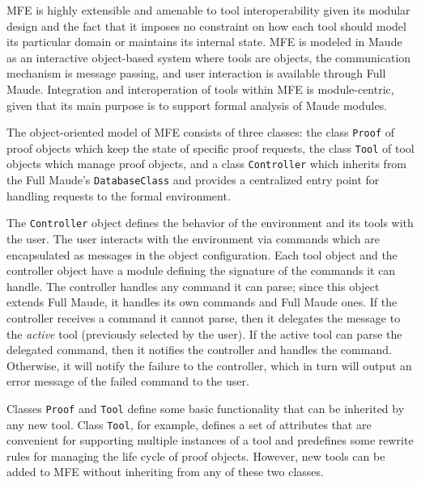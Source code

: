 \documentclass{llncs}
\begin{document}
MFE is highly extensible and amenable to tool interoperability
given its modular design and the fact that it imposes no constraint
on how each tool should model its particular domain or 
 maintains its internal state.
MFE is modeled in Maude as an interactive object-based system where 
tools are objects, the communication mechanism
is message passing, and user interaction is available through Full Maude.
Integration and interoperation of tools within MFE is module-centric,
given that its main purpose is to support formal analysis of Maude modules.

The object-oriented model of MFE consists of three classes: 
the class \texttt{Proof} of proof objects which keep the state of specific proof requests,
the class \texttt{Tool} of tool objects which manage proof objects, and
a class \texttt{Controller}
which inherits from the Full Maude's \texttt{DatabaseClass} 
and provides a centralized entry point for 
handling requests to the formal environment.

The \texttt{Controller} object defines the behavior of the 
environment and its tools with the user. 
The user interacts with the environment via commands
which are encapsulated as messages in the object configuration. Each
tool object and the controller object have a module defining 
the signature of the commands it can handle. 
The controller handles any command it can parse;
since this object extends Full Maude, it handles its own commands
and Full Maude ones.
If the controller receives a command it cannot parse, then it
delegates the message to the {\em active} tool (previously selected by the user). 
If the active tool can parse the delegated command, 
then it notifies the controller and handles the command.
Otherwise, it will notify the failure to the controller,
which in turn will output an error message of the 
failed command to the user.

Classes \texttt{Proof} and \texttt{Tool} define some basic 
functionality that can be inherited by any new tool.
Class {\tt Tool}, for example, defines a set of attributes that
are convenient for supporting multiple instances of a tool and
predefines some rewrite rules for managing the life cycle of proof objects.
However, new tools can be added to MFE without inheriting from
any of these two classes. 

\end{document}
